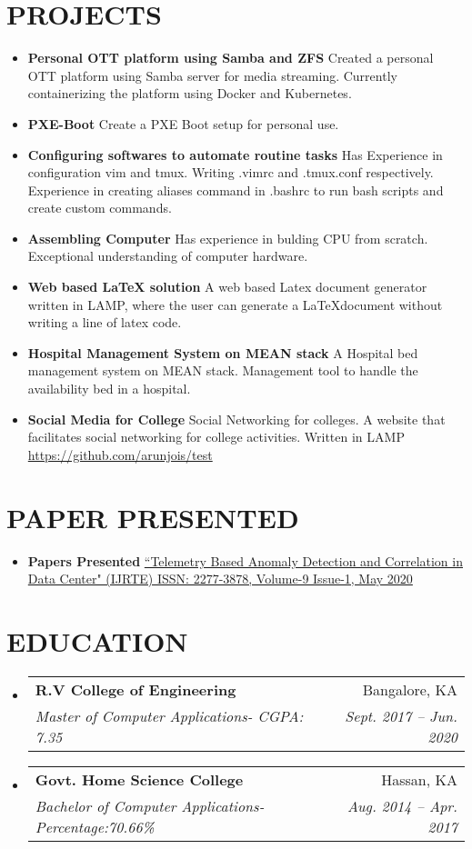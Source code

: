 \documentclass[letterpaper,11pt]{article}
\makeatletter
\newcommand{\resumeItem}[2]{
	\item\small{
		\textbf{#1}{ #2 \vspace{-2pt}}
	}
}
\newcommand{\resumeSubheading}[4]{
	\vspace{-1pt}\item
	\begin{tabular*}{0.97\textwidth}[t]{l@{\extracolsep{\fill}}r}
		\textbf{#1} & #2 \\
		\textit{\small#3} & \textit{\small #4} \\
	\end{tabular*}\vspace{-5pt}
}
\newcommand{\resumeSubItem}[2]{\resumeItem{#1}{#2}\vspace{-4pt}}
\newcommand{\resumeSubHeadingListStart}{\begin{itemize}[leftmargin=*]}
\newcommand{\resumeSubHeadingListEnd}{\end{itemize}}
\makeatother
\begin{document}
	\section{\textbf{PROJECTS}}
	\resumeSubHeadingListStart
	\resumeSubItem{Personal OTT platform using Samba and ZFS}{Created a personal OTT 
	platform using Samba server for media streaming. Currently containerizing the 
	platform using Docker and Kubernetes. }
	\resumeSubItem{PXE-Boot}{Create a PXE Boot setup for personal use.}
	\resumeSubItem{Configuring softwares to automate routine tasks}{Has Experience in 
	configuration vim and tmux. Writing .vimrc and .tmux.conf respectively. Experience in 
	creating aliases command in .bashrc to run bash scripts and create custom commands.}
	\resumeSubItem{Assembling Computer}{Has experience in bulding CPU from scratch. 
	Exceptional understanding of computer hardware.}
	
	\resumeSubItem{Web based LaTeX solution}
	{A web based Latex document generator written in LAMP, where the user can generate 
	a \LaTeX  document without writing a line of latex code. }
	\resumeSubItem{Hospital Management System on MEAN stack}
	{A Hospital bed management system on MEAN stack. Management tool to handle the 
	availability bed in a hospital.}
	\resumeSubItem{Social Media for College}
	{Social Networking for colleges. A website that facilitates social networking for 
		college activities. Written in LAMP \href{https://github.com/arunjois/test} 
		{https://github.com/arunjois/test}}
	\resumeSubHeadingListEnd
	\section{\textbf{ PAPER PRESENTED}}
	\resumeSubHeadingListStart
	\resumeSubItem{Papers Presented} { 
		\href{https://www.ijrte.org/wp-content/uploads/papers/v9i1/A2725059120.pdf}{``Telemetry Based Anomaly Detection and Correlation in Data Center"  (IJRTE) ISSN: 2277-3878, 
			Volume-9 Issue-1, May 2020}}
	\resumeSubHeadingListEnd
	\section{\textbf{EDUCATION}}
	\resumeSubHeadingListStart
	\resumeSubheading
	{R.V College of Engineering}{Bangalore, KA}
	{Master of Computer Applications-  CGPA: 7.35}{Sept. 2017 -- Jun. 2020}
	\resumeSubheading
	{Govt. Home Science College}{Hassan, KA}
	{Bachelor of Computer Applications-  Percentage:70.66\% }{Aug. 2014 -- Apr. 2017}
	\resumeSubHeadingListEnd
	
	
\end{document}
